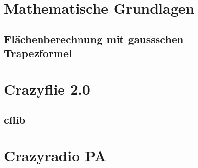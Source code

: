 \section{Mathematische Grundlagen}

\subsection{Flächenberechnung mit gaussschen Trapezformel}

\section{Crazyflie 2.0}

\subsection{cflib}

\section{Crazyradio PA}

\endgroup